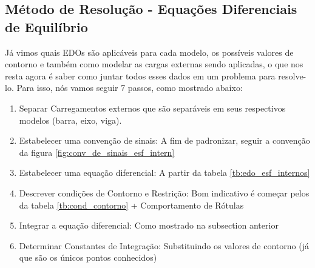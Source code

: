 \documentclass{article}
\begin{document}
        \subsection{Método de Resolução - Equações Diferenciais de Equilíbrio}
            Já vimos quais EDOs são aplicáveis para cada modelo, os possíveis valores de contorno e também como modelar as cargas externas sendo aplicadas, o que nos resta agora é saber como
            juntar todos esses dados em um problema para resolve-lo. Para isso, nós vamos seguir 7 passos, como mostrado abaixo:
            \begin{enumerate}\addtocounter{enumi}{-1}%
                \item Separar Carregamentos externos que são separáveis em seus respectivos modelos (barra, eixo, viga).
                \item Estabelecer uma convenção de sinais: A fim de padronizar, seguir a convenção da figura \ref{fig:conv_de_sinais_esf_intern}
                \item Estabelecer uma equação diferencial: A partir da tabela \ref{tb:edo_esf_internos}
                \item Descrever condições de Contorno e Restrição: Bom indicativo é começar pelos da tabela \ref{tb:cond_contorno} + Comportamento de Rótulas
                \item Integrar a equação diferencial: Como mostrado na subsection anterior
                \item Determinar Constantes de Integração: Substituindo os valores de contorno (já que são os únicos pontos conhecidos)
            \end{enumerate}
\end{document}

